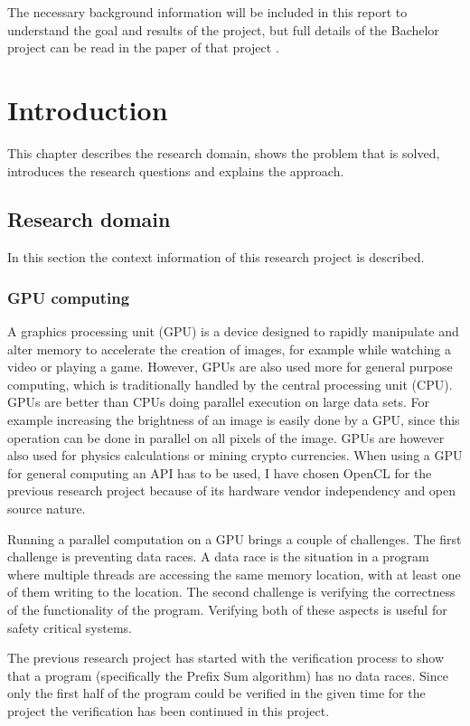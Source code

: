 \documentclass[a4paper]{article}
\begin{document}
The necessary background information will be included in this report to understand the goal and results of the project, but full details of the Bachelor project can be read in the paper of that project \cite{bachelorThesis}.


\newpage
\tableofcontents


\section{Introduction}
This chapter describes the research domain, shows the problem that is solved, introduces the research questions and explains the approach.

\subsection{Research domain}
In this section the context information of this research project is described.

\subsubsection{GPU computing}
A graphics processing unit (GPU) is a device designed to rapidly manipulate and alter memory to accelerate the creation of images, for example while watching a video or playing a game. However, GPUs are also used more for general purpose computing, which is traditionally handled by the central processing unit (CPU). GPUs are better than CPUs doing parallel execution on large data sets. For example increasing the brightness of an image is easily done by a GPU, since this operation can be done in parallel on all pixels of the image. GPUs are however also used for physics calculations or mining crypto currencies. When using a GPU for general computing an API has to be used, I have chosen OpenCL for the previous research project because of its hardware vendor independency and open source nature. 

Running a parallel computation on a GPU brings a couple of challenges. The first challenge is preventing data races. A data race is the situation in a program where multiple threads are accessing the same memory location, with at least one of them writing to the location. The second challenge is verifying the correctness of the functionality of the program. Verifying both of these aspects is useful for safety critical systems.

The previous research project has started with the verification process to show that a program (specifically the Prefix Sum algorithm) has no data races. Since only the first half of the program could be verified in the given time for the project the verification has been continued in this project.
\end{document}

